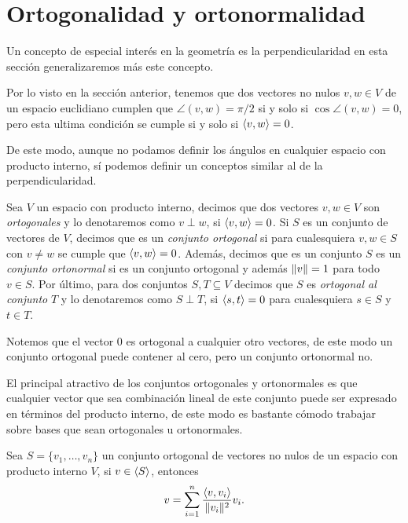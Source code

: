 \section{Ortogonalidad y ortonormalidad}

Un concepto de especial interés en la geometría es la perpendicularidad en esta sección generalizaremos más este concepto.

Por lo visto en la sección anterior, tenemos que dos vectores no nulos $v,w \in V$ de un espacio euclidiano cumplen que $\angle(v,w) = \pi/2$ si y solo si $\cos \angle(v,w) = 0$, pero esta ultima condición se cumple si y solo si $\langle v,w\rangle = 0$.

De este modo, aunque no podamos definir los ángulos en cualquier espacio con producto interno, sí podemos definir un conceptos similar al de la perpendicularidad.

\begin{defi}
  Sea $V$ un espacio con producto interno, decimos que dos vectores $v,w \in V$ son \emph{ortogonales} y lo denotaremos como $v\perp w$, si $\langle v,w\rangle = 0$. Si $S$ es un conjunto de vectores de $V$, decimos que es un \emph{conjunto ortogonal} si para cualesquiera $v,w \in S$ con $v \neq w$ se cumple que $\langle v,w\rangle = 0$. Además, decimos que es un conjunto $S$ es un \emph{conjunto ortonormal} si es un conjunto ortogonal y además $\mathopen\|v\mathclose\| = 1$ para todo $v \in S$. Por último, para dos conjuntos $S,T \subseteq V$ decimos que $S$ es \emph{ortogonal al conjunto} $T$ y lo denotaremos como $S \perp T$, si $\langle s,t\rangle = 0$ para cualesquiera $s\in S$ y $t\in T$.
\end{defi}

Notemos que el vector $0$ es ortogonal a cualquier otro vectores, de este modo un conjunto ortogonal puede contener al cero, pero un conjunto ortonormal no.

El principal atractivo de los conjuntos ortogonales y ortonormales es que cualquier vector que sea combinación lineal de este conjunto puede ser expresado en términos del producto interno, de este modo es bastante cómodo trabajar sobre bases que sean ortogonales u ortonormales.

\begin{teor} \label{teor:ExoFourier}
  Sea $S = \{v_1, \ldots, v_n\}$ un conjunto ortogonal de vectores no nulos de un espacio con producto interno $V$, si $v \in \langle S\rangle$, entonces
    \[
      v = \sum_{i=1}^n \frac{\langle v,v_i\rangle}{\mathopen\|v_i\mathclose\|^2} v_i.
    \]
\end{teor}

